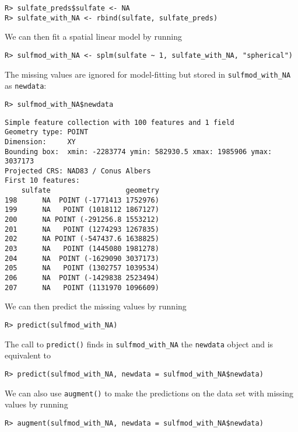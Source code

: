 \documentclass[10pt,letterpaper]{article}
\begin{document}
\begin{verbatim}
R> sulfate_preds$sulfate <- NA
R> sulfate_with_NA <- rbind(sulfate, sulfate_preds)
\end{verbatim}

We can then fit a spatial linear model by running

\begin{verbatim}
R> sulfmod_with_NA <- splm(sulfate ~ 1, sulfate_with_NA, "spherical")
\end{verbatim}

The missing values are ignored for model-fitting but stored in
\texttt{sulfmod\_with\_NA} as \texttt{newdata}:

\begin{verbatim}
R> sulfmod_with_NA$newdata
\end{verbatim}

\begin{verbatim}
Simple feature collection with 100 features and 1 field
Geometry type: POINT
Dimension:     XY
Bounding box:  xmin: -2283774 ymin: 582930.5 xmax: 1985906 ymax: 3037173
Projected CRS: NAD83 / Conus Albers
First 10 features:
    sulfate                  geometry
198      NA  POINT (-1771413 1752976)
199      NA   POINT (1018112 1867127)
200      NA POINT (-291256.8 1553212)
201      NA   POINT (1274293 1267835)
202      NA POINT (-547437.6 1638825)
203      NA   POINT (1445080 1981278)
204      NA  POINT (-1629090 3037173)
205      NA   POINT (1302757 1039534)
206      NA  POINT (-1429838 2523494)
207      NA   POINT (1131970 1096609)
\end{verbatim}

We can then predict the missing values by running

\begin{verbatim}
R> predict(sulfmod_with_NA)
\end{verbatim}

The call to \texttt{predict()} finds in \texttt{sulfmod\_with\_NA} the
\texttt{newdata} object and is equivalent to

\begin{verbatim}
R> predict(sulfmod_with_NA, newdata = sulfmod_with_NA$newdata)
\end{verbatim}

We can also use \texttt{augment()} to make the predictions on the data
set with missing values by running

\begin{verbatim}
R> augment(sulfmod_with_NA, newdata = sulfmod_with_NA$newdata)
\end{verbatim}
\end{document}

